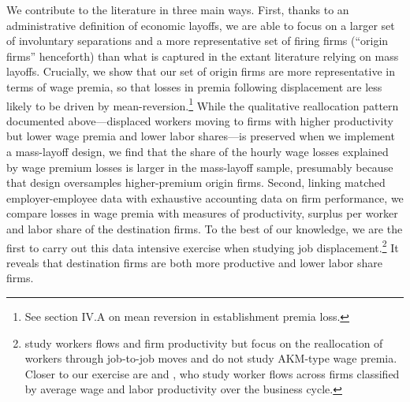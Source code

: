 We contribute to the literature in three main ways. First, thanks to an administrative definition of economic layoffs, we are able to focus on a larger set of involuntary separations and a more representative set of firing firms (``origin firms'' henceforth) than what is captured in the extant literature relying on mass layoffs. Crucially, we show that our set of origin firms are more representative in terms of wage premia, so that losses in premia following displacement are less likely to be driven by mean-reversion.\footnote{See \cite{Schmieder2020} section IV.A on mean reversion in establishment premia loss. } While the qualitative reallocation pattern documented above---displaced workers moving to firms with higher productivity but lower wage premia and lower labor shares---is preserved when we implement a mass-layoff design, we find that the share of the hourly wage losses explained by wage premium losses is larger in the mass-layoff sample, presumably because that design oversamples higher-premium origin firms. Second, %
linking matched employer-employee data with exhaustive accounting data on firm performance, we compare losses in wage premia with measures of productivity, surplus per worker and labor share of the destination firms. To the best of our knowledge, we are the first to carry out this data intensive exercise when studying job displacement.\footnote{\cite{haltiwanger2018moves} study workers flows and firm productivity but focus on the reallocation of workers through job-to-job moves and do not study AKM-type wage premia. Closer to our exercise are \citet{haltiwanger2018cyclical} and \citet{bertheau_vejlin_2023}, who study worker flows across firms classified by average wage and labor productivity over the business cycle.} It reveals that destination firms are both more productive and lower labor share firms.
